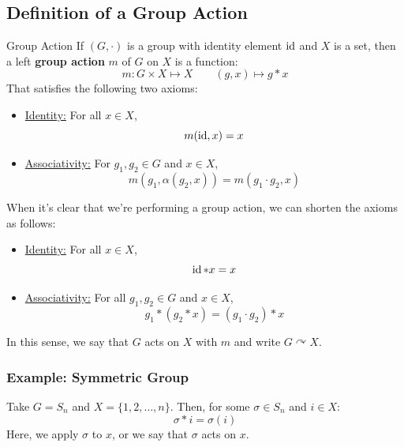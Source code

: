 \documentclass[letterpaper]{article}
\begin{document}
\subsection{Definition of a Group Action}
\begin{definition}{Group Action}{}
    If $(G, \cdot)$ is a group with identity element $\operatorname{id}$ and $X$ is a set, then a left \textbf{group action} $m$ of $G$ on $X$ is a function: 
    \[m: G \times X \mapsto X \qquad (g, x) \mapsto g * x\]
    That satisfies the following two axioms: 
    \begin{itemize}
        \item \underline{Identity:} For all $x \in X$,
        \[m(\operatorname{id}, x) = x\]
        \item \underline{Associativity:} For $g_1, g_2 \in G$ and $x \in X$, 
        \[m(g_1, \alpha(g_2, x)) = m(g_1 \cdot g_2, x)\]
    \end{itemize}

    When it's clear that we're performing a group action, we can shorten the axioms as follows: 
    \begin{itemize}
        \item \underline{Identity:} For all $x \in X$,
        \[\operatorname{id} * x = x\]
        \item \underline{Associativity:} For all $g_1, g_2 \in G$ and $x \in X$, 
        \[g_1 * (g_2 * x) = (g_1 \cdot g_2) * x\]
    \end{itemize}

    In this sense, we say that $G$ acts on $X$ with $m$ and write $G \curvearrowright X$.
\end{definition}

\subsubsection{Example: Symmetric Group}
Take $G = S_n$ and $X = \{1, 2, \dots, n\}$. Then, for some $\sigma \in S_n$ and $i \in X$: 
\[\sigma * i = \sigma(i)\]
Here, we apply $\sigma$ to $x$, or we say that $\sigma$ acts on $x$. 
\end{document}
